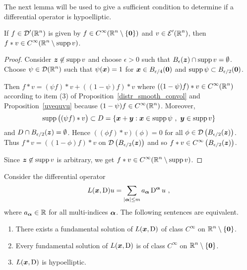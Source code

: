 The next lemma will be used to give a sufficient condition to
determine if a differential operator is hypoelliptic.

\begin{lemma} \label{distr_lemma_hypo}
If $\displaystyle f \in \mathcal{D}'(\mathbb{R}^n)$ is given by
$\displaystyle f\in C^\infty(\mathbb{R}^n\setminus \{{\bm{0}}\})$
and $\displaystyle v \in \mathcal{E}'(\mathbb{R}^n)$, then
$\displaystyle f\ast v \in C^\infty(\mathbb{R}^n\setminus \operatorname{supp} v)$.
\end{lemma}

\begin{proof}
Consider ${\bm{z}} \not\in \operatorname{supp} v$ and choose $\epsilon >0$ such that
$\displaystyle B_\epsilon({\bm{z}}) \cap \operatorname{supp} v = \emptyset$.
Choose $\displaystyle \psi \in \mathcal{D}(\mathbb{R}^n)$ such that $\psi({\bm{x}}) = 1$ for
$\displaystyle {\bm{x}} \in B_{\epsilon/4}({\bm{0}})$ and
$\displaystyle \operatorname{supp} \psi \subset B_{\epsilon/2}({\bm{0}})$.

Then $f\ast v = (\psi f)\ast v + ( (1-\psi)f) \ast v$ where
$\displaystyle ((1-\psi) f) \ast v \in C^\infty(\mathbb{R}^n)$ according to
item (3) of Proposition~\ref{distr_smooth_convol} and
Proposition~\ref{uvequvu} because
$\displaystyle (1-\psi) f \in C^\infty(\mathbb{R}^n)$.  Moreover,
\[
\operatorname{supp} \big( (\psi f)\ast v\big) \subset D = \left\{ {\bm{x}} + {\bm{y}}
: {\bm{x}} \in \operatorname{supp} \psi \ , \ {\bm{y}} \in \operatorname{supp} v \right\}
\]
and $\displaystyle D \cap B_{\epsilon/2}({\bm{z}}) = \emptyset$.
Hence $((\phi f)\ast v)(\phi) = 0$ for all
$\displaystyle \phi \in \mathcal{D}\left(B_{\epsilon/2}({\bm{z}})\right)$.
Thus $\displaystyle f\ast v = ((1-\phi)f) \ast v$ on
$\displaystyle \mathcal{D}\left(B_{\epsilon/2}({\bm{z}})\right)$ and so
$\displaystyle f\ast v \in C^\infty\left(B_{\epsilon/2}({\bm{z}})\right)$.

Since ${\bm{z}} \not\in \operatorname{supp} v$ is arbitrary, we get
$\displaystyle f\ast v \in C^\infty(\mathbb{R}^n\setminus \operatorname{supp} v)$.
\end{proof}

\begin{theorem} \label{distr_hypoTH}
Consider the differential operator
\[
L({\bm{x}},\operatorname{D})u = \sum_{|{\bm{\alpha}}|\leq m} a_{{\bm{\alpha}}}
\operatorname{D}^{{\bm{\alpha}}} u \ ,
\]
where $a_{{\bm{\alpha}}} \in \mathbb{R}$ for all multi-indices ${\bm{\alpha}}$.
The following sentences are equivalent.
\begin{enumerate}
\item There exists a fundamental solution of $L({\bm{x}},\operatorname{D})$ of
class $\displaystyle C^\infty$ on $\displaystyle \mathbb{R}^n\setminus \{{\bm{0}}\}$.
\item Every fundamental solution of $L({\bm{x}},\operatorname{D})$ is of class
$\displaystyle C^\infty$ on $\displaystyle \mathbb{R}^n\setminus \{{\bm{0}}\}$.
\item $L({\bm{x}},\operatorname{D})$ is hypoelliptic.
\end{enumerate}
\end{theorem}

